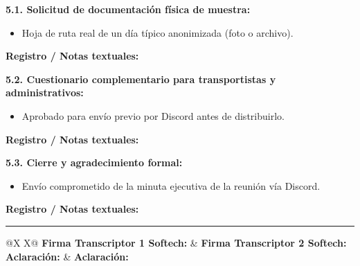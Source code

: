 \documentclass[10pt,a4paper]{article}
\newcommand{\espacioNotas}[1]{%
  \vspace{2pt}%
  \noindent\textbf{\footnotesize Registro / Notas textuales:}\par
  \noindent\fbox{%
    \parbox{\dimexpr\textwidth-2\fboxsep-2\fboxrule\relax}{%
      \vspace{#1pt}%
    }%
  }%
  \vspace{3pt}%
}
\begin{document}
\noindent
\textbf{5.1. Solicitud de documentación física de muestra:}
\begin{itemize}[label=$\square$]
  \item Hoja de ruta real de un día típico anonimizada (foto o archivo).
\end{itemize}
\espacioNotas{22}

\noindent
\textbf{5.2. Cuestionario complementario para transportistas y administrativos:}
\begin{itemize}[label=$\square$]
  \item Aprobado para envío previo por Discord antes de distribuirlo.
\end{itemize}
\espacioNotas{20}

\noindent
\textbf{5.3. Cierre y agradecimiento formal:}
\begin{itemize}[label=$\square$]
  \item Envío comprometido de la minuta ejecutiva de la reunión vía Discord.
\end{itemize}
\espacioNotas{18}

\vspace{8pt}
\hrule
\vspace{6pt}

\noindent
\begin{tabularx}{\textwidth}{@{}X X@{}}
  \textbf{Firma Transcriptor 1 Softech:} \hrulefill & \textbf{Firma Transcriptor 2 Softech:} \hrulefill \\[10pt]
  \textbf{Aclaración:} \hrulefill & \textbf{Aclaración:} \hrulefill \\[10pt]
   \\
\end{tabularx}
\end{document}
